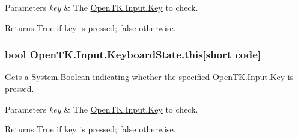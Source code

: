 \begin{DoxyParams}{Parameters}
{\em key} & The \hyperlink{namespace_open_t_k_1_1_input_a30415d20dcc907a84693777cc0bdf1c7}{Open\-T\-K.\-Input.\-Key} to check.\\
\hline
\end{DoxyParams}
\begin{DoxyReturn}{Returns}
True if key is pressed; false otherwise.
\end{DoxyReturn}
\hypertarget{struct_open_t_k_1_1_input_1_1_keyboard_state_ab91b7bdd0c271b1b95ee3f22bee72320}{
\subsubsection[{this[short code]}]{\setlength{\rightskip}{0pt plus 5cm}bool Open\-T\-K.\-Input.\-Keyboard\-State.\-this\mbox{[}short code\mbox{]}\hspace{0.3cm}{\ttfamily [get]}}}\label{struct_open_t_k_1_1_input_1_1_keyboard_state_ab91b7bdd0c271b1b95ee3f22bee72320}


Gets a System.\-Boolean indicating whether the specified \hyperlink{namespace_open_t_k_1_1_input_a30415d20dcc907a84693777cc0bdf1c7}{Open\-T\-K.\-Input.\-Key} is pressed. 


\begin{DoxyParams}{Parameters}
{\em key} & The \hyperlink{namespace_open_t_k_1_1_input_a30415d20dcc907a84693777cc0bdf1c7}{Open\-T\-K.\-Input.\-Key} to check.\\
\hline
\end{DoxyParams}
\begin{DoxyReturn}{Returns}
True if key is pressed; false otherwise.
\end{DoxyReturn}
